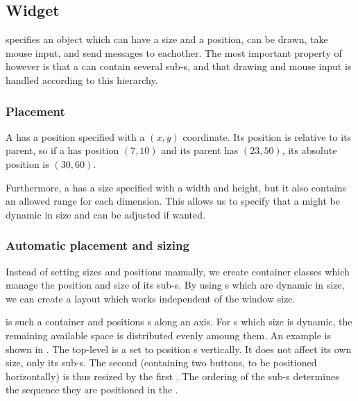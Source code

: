 
\subsection{Widget}
\label{sec:widget}

 specifies an object which can have a size and a position, can be
drawn, take mouse input, and send messages to eachother. The most important
property of  however is that a  can contain
several sub-s, and that drawing and mouse input is handled
according to this hierarchy.


\subsubsection{Placement}

A  has a position specified with a $(x,y)$ coordinate. Its
position is relative to its parent, so if a  has position
$(7,10)$ and its parent has $(23,50)$, its absolute position is $(30,60)$.

Furthermore, a  has a size specified with a width and height,
but it also contains an allowed range for each dimension. This allows us to
specify that a  might be dynamic in size and can be adjusted if
wanted.

\subsubsection{Automatic placement and sizing}

Instead of setting sizes and positions manually, we create container classes
which manage the position and size of its sub-s. By using
s which are dynamic in size, we can create a layout which works
independent of the window size.

 is such a container  and positions
s along an axis. For s which size is dynamic,
the remaining available space is distributed evenly amoung them. An example is
shown in . The top-level  is a
 set to position s vertically. It does
not affect its own size, only its sub-s. The second
 (containing two buttons, to be positioned
horizontally) is thus resized by the first . The
ordering of the sub-s determines the sequence they are
positioned in the .

